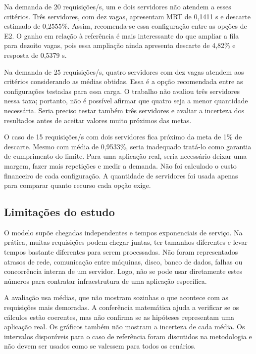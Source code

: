 \documentclass[10pt]{ieeeconf}
\begin{document}
Na demanda de 20 requisições/s, um e dois servidores não atendem a esses critérios. Três servidores, com dez vagas, apresentam MRT de 0,1411 s e descarte estimado de 0,2555\%. Assim, recomenda-se essa configuração entre as opções de E2. O ganho em relação à referência é mais interessante do que ampliar a fila para dezoito vagas, pois essa ampliação ainda apresenta descarte de 4,82\% e resposta de 0,5379 s.

Na demanda de 25 requisições/s, quatro servidores com dez vagas atendem aos critérios considerando as médias obtidas. Essa é a opção recomendada entre as configurações testadas para essa carga. O trabalho não avaliou três servidores nessa taxa; portanto, não é possível afirmar que quatro seja a menor quantidade necessária. Seria preciso testar também três servidores e avaliar a incerteza dos resultados antes de aceitar valores muito próximos das metas.

O caso de 15 requisições/s com dois servidores fica próximo da meta de 1\% de descarte. Mesmo com média de 0,9533\%, seria inadequado tratá-lo como garantia de cumprimento do limite. Para uma aplicação real, seria necessário deixar uma margem, fazer mais repetições e medir a demanda. Não foi calculado o custo financeiro de cada configuração. A quantidade de servidores foi usada apenas para comparar quanto recurso cada opção exige.

\subsection{Limitações do estudo}
O modelo supõe chegadas independentes e tempos exponenciais de serviço. Na prática, muitas requisições podem chegar juntas, ter tamanhos diferentes e levar tempos bastante diferentes para serem processadas. Não foram representados atrasos de rede, comunicação entre máquinas, disco, banco de dados, falhas ou concorrência interna de um servidor. Logo, não se pode usar diretamente estes números para contratar infraestrutura de uma aplicação específica.

A avaliação usa médias, que não mostram sozinhas o que acontece com as requisições mais demoradas. A conferência matemática ajuda a verificar se os cálculos estão coerentes, mas não confirma se as hipóteses representam uma aplicação real. Os gráficos também não mostram a incerteza de cada média. Os intervalos disponíveis para o caso de referência foram discutidos na metodologia e não devem ser usados como se valessem para todos os cenários.
\end{document}
